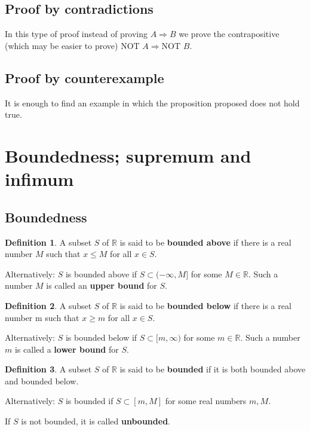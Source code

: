 \documentclass[12pt, a4paper]{article}
\newcommand{\bb}[1]{\mathbb{#1}}
\newcommand{\imply}{\Rightarrow}
\theoremstyle{definition}
\newtheorem{definition}{Definition}[section]
\theoremstyle{plain}
\begin{document}
\subsection{Proof by contradictions}

In this type of proof instead of proving $A\imply B$ we prove the contrapositive (which may be easier to prove) $\text{NOT }A \imply \text{NOT }B.$

\subsection{Proof by counterexample}

It is enough to find an example in which the proposition proposed does not hold true.

\section{Boundedness; supremum and infimum}

\subsection{Boundedness}

\begin{definition}
A subset $S$ of $\bb{R}$ is said to be \textbf{bounded above} if there is a real number $M$ such that $x \leq M$ for all $x \in S.$

Alternatively: $S$ is bounded above if $S \subset (-\infty,M]$ for some $M \in \bb{R}.$ Such a number $M$ is called an \textbf{upper bound} for $S.$
\end{definition}

\begin{definition}
A subset $S$ of $\bb{R}$ is said to be \textbf{bounded below} if there is a real number m such that $x \geq m$ for all $x \in S.$

Alternatively: $S$ is bounded below if $S \subset [m,\infty)$ for some $m \in \bb{R}$. Such a number $m$ is called a \textbf{lower bound} for $S.$
\end{definition}

\begin{definition}
A subset $S$ of $\bb{R}$ is said to be \textbf{bounded} if it is both bounded above and bounded below. 

Alternatively: $S$ is bounded if $S \subset [m,M]$ for some real numbers $m, M.$

If $S$ is not bounded, it is called \textbf{unbounded}.
\end{definition}
\end{document}
